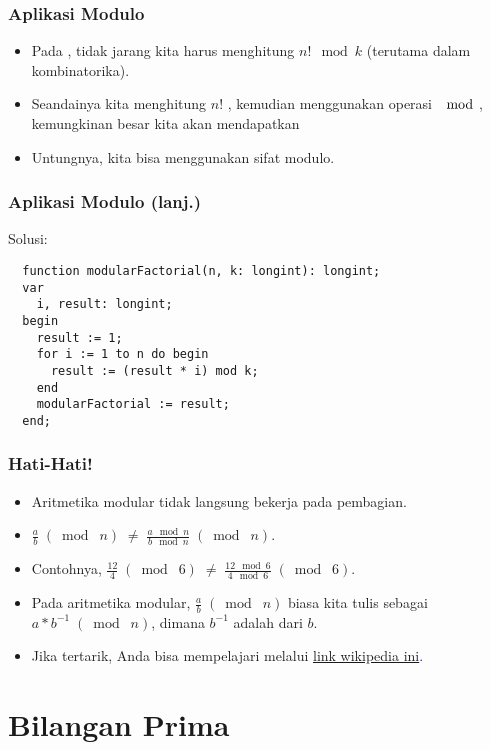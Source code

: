 \begin{frame}
\frametitle{Aplikasi Modulo}
\begin{itemize}
  \item Pada , tidak jarang kita harus menghitung $n! \mod k$ (terutama dalam kombinatorika). 
  \item Seandainya kita menghitung $n!$ , kemudian menggunakan operasi $\mod$, kemungkinan besar kita akan mendapatkan 
  \item Untungnya, kita bisa menggunakan sifat modulo.
\end{itemize}
\end{frame}

\begin{frame}[fragile]
\frametitle{Aplikasi Modulo (lanj.)}
Solusi: 
\begin{lstlisting}
  function modularFactorial(n, k: longint): longint;
  var
    i, result: longint;
  begin
    result := 1;
    for i := 1 to n do begin
      result := (result * i) mod k;
    end
    modularFactorial := result;
  end;  
\end{lstlisting}
\end{frame}

\begin{frame}
\frametitle{Hati-Hati!}
\begin{itemize}
  \item Aritmetika modular tidak langsung bekerja pada pembagian.
  \item $\frac{a}{b} \; (\bmod\; n) \; \neq \; \frac{a \mod n}{b \mod n} \; (\bmod\; n)$.
  \item Contohnya, $\frac{12}{4} \; (\bmod\; 6) \; \neq \; \frac{12 \mod 6}{4 \mod 6} \; (\bmod\; 6)$.
  \item Pada aritmetika modular, $\frac{a}{b} \; (\bmod\; n)$ biasa kita tulis sebagai $a * b^{-1}\;(\bmod\; n)$, dimana $b^{-1}$ adalah 
       dari $b$.
  \item Jika tertarik, Anda bisa mempelajari  melalui \textcolor{blue}{\href{https://en.wikipedia.org/wiki/  Modular_multiplicative_inverse}{link wikipedia ini}.} 
\end{itemize}
\end{frame}

\section{Bilangan Prima}
\frame{\sectionpage}

